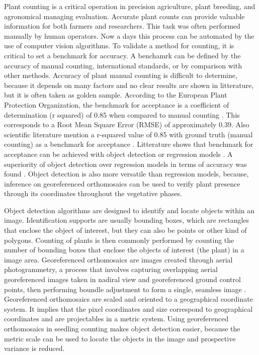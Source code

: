 \documentclass[journal,article,submit,pdftex,moreauthors]{Definitions/mdpi}
\begin{document}
Plant counting is a critical operation in precision agriculture, plant breeding, 
and agronomical managing evaluation. 
Accurate plant counts can provide valuable information for both farmers and researchers.
This task was often performed manually by human operators. 
Now a days this process can be automated by the use of computer vision algorithms.
To validate a method for counting, it is critical to set a benchmark for accuracy. 
A benchamrk can be defined by the accuracy of manual counting, international standards, 
or by comparison with other methods.
Accuracy of plant manual counting is difficult to determine, because it depends on
many factors and no clear results are shown in litterature, but it is often taken as golden sample. 
According to the European Plant Protection Organization, the benchmark for acceptance is 
a coefficient of determination (r squared) of 0.85 when compared to manual counting \cite{PP13332024}.
This corresponds to a Root Mean Square Error (RMSE) of approximately 0.39.
Also scientific literature mention a r-squared value of 0.85 with ground truth (manual counting) 
as a benchmark for acceptance \cite{zouMaizeTasselsDetection2020}.
Litterature shows that benchmark for acceptance can be achieved with object detection
 \cite{liuIntegrateNetDeepLearning2022,davidPlantDetectionCounting2021,barretoAutomaticUAVbasedCounting2021}
or regression models \cite{liuEstimatingMaizeSeedling2022,velumaniEstimatesMaizePlant2021}.
A superiority of object detection over regression models in terms of accuracy was found
\cite{zouMaizeTasselsDetection2020}. Object detection is also more versatile than
regression models, because, inference on georeferenced orthomosaics can be used to
verify plant presence through its coordinates throughout the vegetative phases.

Object detection algorithms are designed to identify and locate objects within an image.
Identification supports are usually bounding boxes, which are rectangles that enclose
the object of interest, but they can also be points or other kind of polygons.
Counting of plants is then commonly performed by counting the number of bounding boxes 
that enclose the objects of interest (the plant) in a image area.
Georeferenced orthomosaics are images created through aerial photogrammetry, a process 
that involves capturing overlapping aerial georeferenced images taken in nadiral view
and georeferenced ground control points, then performing boundle adjustment to form 
a single, seamless image \cite{krausPhotogrammetryGeometryImages2011}.
Georeferenced orthomosaics are scaled and oriented to a geographical coordinate system.
It implies that the pixel coordinates and size correspond to 
geographical coordinates and are projectables in a metric system.
Using georeferenced orthomosaics in seedling counting makes object detection 
easier, because the metric scale can be used to locate the objects 
in the image and prospective variance is reduced.
\end{document}
